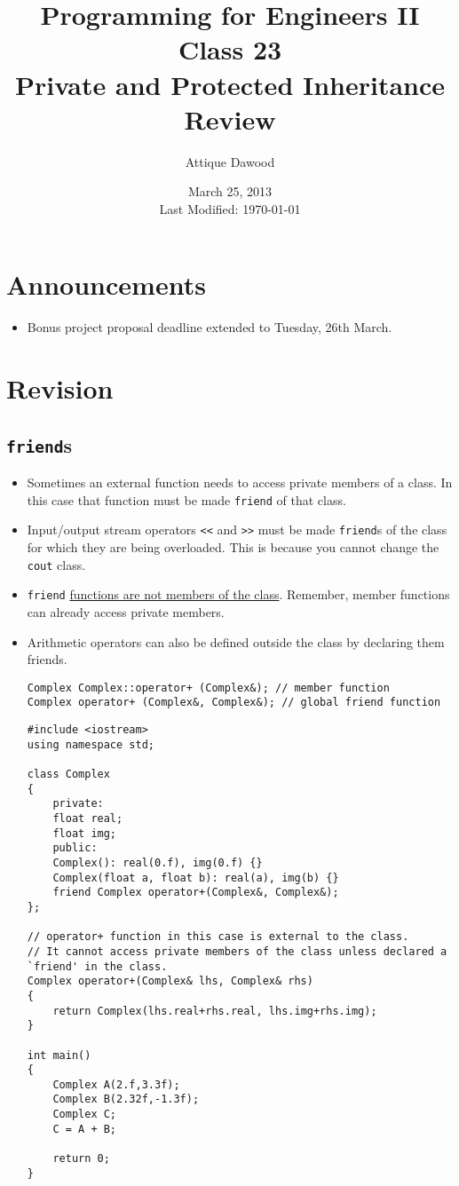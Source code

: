 \documentclass[12pt,a4paper]{article}
\title{\vspace{-2cm}Programming for Engineers II\\Class 23\\Private and Protected Inheritance\\Review}
\author{Attique Dawood}
\date{March 25, 2013\\[0.2cm] Last Modified: \today}
\begin{document}
\maketitle
\section{Announcements}
\begin{itemize}
\item Bonus project proposal deadline extended to Tuesday, 26th March.
\end{itemize}
\section{Revision}
\subsection{\texttt{friend}s}
\begin{itemize}
\item Sometimes an external function needs to access private members of a class. In this case that function must be made \verb|friend| of that class.
\item Input/output stream operators \verb|<<| and \verb|>>| must be made \verb|friend|s of the class for which they are being overloaded. This is because you cannot change the \verb|cout| class.
\item \verb|friend| \underline{functions are not members of the class}. Remember, member functions can already access private members.
\item Arithmetic operators can also be defined outside the class by declaring them friends.
\begin{lstlisting}[caption={operator+ prototype as member function and as \texttt{friend}}]
Complex Complex::operator+ (Complex&); // member function
Complex operator+ (Complex&, Complex&); // global friend function
\end{lstlisting}
\begin{lstlisting}[caption={operator+ implemented as \texttt{friend}}]
#include <iostream>
using namespace std;

class Complex
{
	private:
	float real;
	float img;
	public:
	Complex(): real(0.f), img(0.f) {}
	Complex(float a, float b): real(a), img(b) {}
	friend Complex operator+(Complex&, Complex&);
};

// operator+ function in this case is external to the class.
// It cannot access private members of the class unless declared a `friend' in the class.
Complex operator+(Complex& lhs, Complex& rhs)
{
	return Complex(lhs.real+rhs.real, lhs.img+rhs.img);
}

int main()
{
	Complex A(2.f,3.3f);
	Complex B(2.32f,-1.3f);
	Complex C;
	C = A + B;

	return 0;
}
\end{lstlisting}
\end{itemize}
\end{document}
